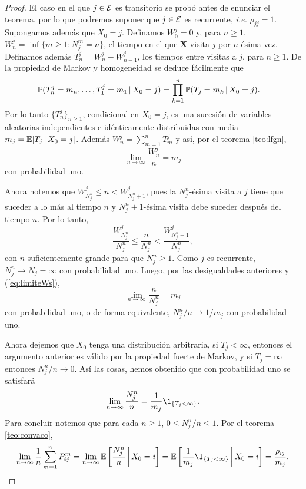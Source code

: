 \begin{proof}
    El caso en el que $j \in \mathcal{E}$ es transitorio se probó antes de enunciar el teorema, por lo que podremos suponer que $j \in \mathcal{E}$ es recurrente, \emph{i.e.} $\rho_{jj} = 1$. Supongamos además que $X_0 = j$. Definamos $W_0^j = 0$ y, para $n \geq 1$, $W_n^j = \inf\{m \geq 1 : N_j^m = n\}$, el tiempo en el que $\bm X$ visita $j$ por $n$-ésima vez. Definamos además $T_n^j = W_n^j - W_{n-1}^j$, los tiempos entre visitas a $j$, para $n \geq 1$. De la propiedad de Markov y homogeneidad se deduce fácilmente que
    \begin{align*}
        \mathbb{P}(T_n^j = m_n, \ldots, T_1^j = m_1 \,\vert\, X_0 = j) & = \prod_{k = 1}^{n} \mathbb{P}(T_j = m_k \,\vert\, X_0 = j).
    \end{align*}
    Por lo tanto $\{T_n^j\}_{n \geq 1}$, condicional en $X_0 = j$, es una sucesión de variables aleatorias independientes e idénticamente distribuidas con media $m_j = \mathbb{E}[T_j \,\vert\, X_0 = j]$. Además $W_n^j = \sum_{m = 1}^n T_m^j$ y así, por el teorema \ref{teo:lfgn},
    \begin{equation}
        \lim_{n \to \infty} \frac{W_n^j}{n} = m_j  \label{eq:limiteWs}
    \end{equation}
    con probabilidad uno.

    Ahora notemos que $W_{N_j^n}^j \leq n < W_{N_j^n + 1}^j$, pues la $N_j^n$-ésima visita a $j$ tiene que suceder a lo más al tiempo $n$ y $N_j^n + 1$-ésima visita debe suceder después del tiempo $n$. Por lo tanto, 
    \[
        \frac{W_{N_j^n}^j}{N_j^n} \leq \frac n {N_j^n} < \frac{W_{N_j^n+1}^j}{N_j^n},
    \]
    con $n$ suficientemente grande para que $N_j^n \geq 1$. Como $j$ es recurrente, $N_j^n \to N_j = \infty$ con probabilidad uno. Luego, por las desigualdades anteriores y (\ref{eq:limiteWs}), 
    \[
        \lim_{n \to \infty} \frac{n}{N_j^n} = m_j
    \]
    con probabilidad uno, o de forma equivalente, $N_j^n/n \to 1/m_j$ con probabilidad uno.

    Ahora dejemos que $X_0$ tenga una distribución arbitraria, si $T_j < \infty$, entonces el argumento anterior es válido por la propiedad fuerte de Markov, y si $T_j = \infty$ entonces $N_j^n/n \to 0$. Así las cosas, hemos obtenido que con probabilidad uno se satisfará
    \[
        \lim_{n \to \infty} \frac{N_j^n} n = \frac{1}{m_j} \1_{\{T_j < \infty\}}.
    \]
    Para concluir notemos que para cada $n \geq 1$, $0 \leq N_j^n /n \leq 1$. Por el teorema \ref{teo:convaco},
    \[
        \lim_{n \to \infty} \frac 1 n \sum_{m = 1}^n P_{ij}^m = \lim_{n \to \infty} \EE\left[ \frac{N_j^n}n \,\bigg\vert\, X_0 = i\right] = \EE\left[ \frac 1 {m_j} \1_{\{T_j < \infty\}} \,\bigg\vert\, X_0 = i\right] = \frac{\rho_{ij}}{m_j}. \qedhere
    \]
\end{proof}

